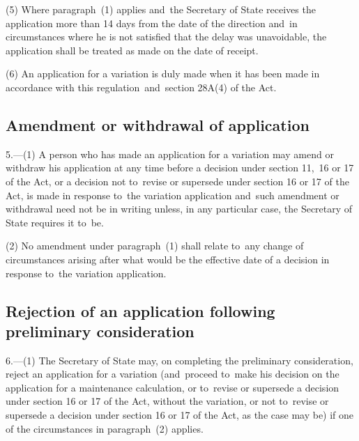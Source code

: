 \documentclass[12pt,a4paper]{article}
\begin{document}
(5) Where paragraph~(1) applies and~the Secretary of State receives the application more than 14 days from the date of the direction and~in circumstances where he is not satisfied that the delay was unavoidable, the application shall be treated as made on the date of receipt.

(6) An application for a variation is duly made when it has been made in accordance with this regulation~and~section 28A(4) of the Act.

\subsection[5. Amendment or withdrawal of application]{Amendment or withdrawal of application}

5.---(1)  A person who has made an application for a variation may amend or withdraw his application at any time before a decision under section 11,~16 or 17 of the Act, or a decision not to~revise or supersede under section 16 or 17 of the Act, is made in response to~the variation application and~such amendment or withdrawal need not be in writing unless, in any particular case, the Secretary of State requires it to~be.

(2) No amendment under paragraph~(1) shall relate to~any change of circumstances arising after what would be the effective date of a decision in response to~the variation application.

\subsection[6. Rejection of an application following preliminary consideration]{Rejection of an application following preliminary consideration}

6.---(1)  The Secretary of State may, on completing the preliminary consideration, reject an application for a variation (and~proceed to~make his decision on the application for a maintenance calculation, or to~revise or supersede a decision under section 16 or 17 of the Act, without the variation, or not to~revise or supersede a decision under section 16 or 17 of the Act, as the case may be) if one of the circumstances in paragraph~(2) applies.
\end{document}

